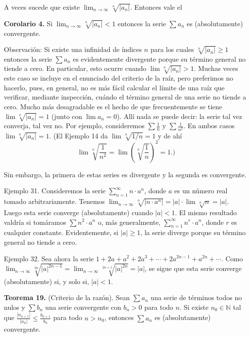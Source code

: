 \documentclass[12pt,oneside]{book}
\begin{document}
A veces sucede que existe \(\lim_{n \to \infty} \sqrt[n]{|a_n|}\). Entonces vale el

\textbf{Corolario 4.} Si \(\lim_{n \to \infty} \sqrt[n]{|a_n|} < 1\) entonces la serie \(\sum a_n\) es (absolutamente) convergente.

Observación: Si existe una infinidad de índices \(n\) para los cuales \(\sqrt[n]{|a_n|} \geq 1\) entonces la serie \(\sum a_n\) es evidentemente divergente porque su término general no tiende a cero. En particular, esto ocurre cuando \(\lim \sqrt[n]{|a_n|} > 1\). Muchas veces este caso se incluye en el enunciado del criterio de la raíz, pero preferimos no hacerlo, pues, en general, no es más fácil calcular el límite de una raíz que verificar, mediante inspección, cuándo el término general de una serie no tiende a cero. Mucho más desagradable es el hecho de que frecuentemente se tiene \(\lim \sqrt[n]{|a_n|} = 1\) (junto con \(\lim a_n = 0\)). Allí nada se puede decir: la serie tal vez converja, tal vez no. Por ejemplo, consideremos \(\sum \frac{1}{n}\) y \(\sum \frac{1}{n^2}\). En ambos casos \(\lim \sqrt[n]{|a_n|} = 1\). (El Ejemplo 14 da \(\lim \sqrt[n]{1/n} = 1\) y de ahí
\[
\lim \sqrt[n]{\frac{1}{n^2}} = \lim \left( \sqrt[n]{\frac{1}{n}} \right)^2 = 1.)
\]

Sin embargo, la primera de estas series es divergente y la segunda es convergente.

Ejemplo 31. Consideremos la serie \(\sum_{n=1}^{\infty} n \cdot a^n\), donde \(a\) es un número real tomado arbitrariamente. Tenemos \(\lim_{n \to \infty} \sqrt[n]{|n \cdot a^n|} = |a| \cdot \lim \sqrt[n]{n} = |a|\). Luego esta serie converge (absolutamente) cuando \(|a| < 1\). El mismo resultado valdría si tomáramos \(\sum n^2 \cdot a^n\) o, más generalmente, \(\sum_{n=1}^{\infty} n^r \cdot a^n\), donde \(r\) es cualquier constante. Evidentemente, si \(|a| \geq 1\), la serie diverge porque su término general no tiende a cero.

Ejemplo 32. Sea ahora la serie \(1 + 2a + a^2 + 2a^3 + \cdots + 2a^{2n-1} + a^{2n} + \cdots\). Como \(\lim_{n \to \infty} \sqrt[2n]{|a|^{2n-1}} = \lim_{n \to \infty} \sqrt[2n+1]{|a|^{2n}} = |a|\), se sigue que esta serie converge (absolutamente) si, y solo si, \(|a| < 1\).

\textbf{Teorema 19.} (Criterio de la razón). Sean \(\sum a_n\) una serie de términos todos no nulos y \(\sum b_n\) una serie convergente con \(b_n > 0\) para todo \(n\). Si existe \(n_0 \in \mathbb{N}\) tal que \(\frac{|a_{n+1}|}{|a_n|} \leq \frac{b_{n+1}}{b_n}\) para todo \(n > n_0\), entonces \(\sum a_n\) es (absolutamente) convergente.
\end{document}
